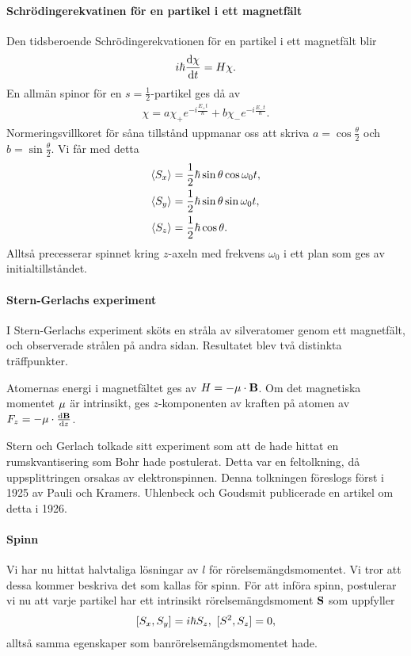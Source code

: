 \paragraph{Schrödingerekvatinen för en partikel i ett magnetfält}
Den tidsberoende Schrödingerekvationen för en partikel i ett magnetfält blir
\begin{align*}
	i\hbar\dv{\chi}{t} = H\chi.
\end{align*}
En allmän spinor för en $s = \frac{1}{2}$-partikel ges då av
\begin{align*}
	\chi = a\chi_{+}e^{-i\frac{E_{+}t}{\hbar}} + b\chi_{-}e^{-i\frac{E_{-}t}{\hbar}}.
\end{align*}
Normeringsvillkoret för såna tillstånd uppmanar oss att skriva $a = \cos{\frac{\theta}{2}}$ och $b = \sin{\frac{\theta}{2}}$. Vi får med detta
\begin{align*}
	\expval{S_{x}} &= \frac{1}{2}\hbar\sin{\theta}\cos{\omega_{0}t}, \\
	\expval{S_{y}} &= \frac{1}{2}\hbar\sin{\theta}\sin{\omega_{0}t}, \\
	\expval{S_{z}} &= \frac{1}{2}\hbar\cos{\theta}.
\end{align*}
Alltså precesserar spinnet kring $z$-axeln med frekvens $\omega_{0}$ i ett plan som ges av initialtillståndet.

\paragraph{Stern-Gerlachs experiment}
I Stern-Gerlachs experiment sköts en stråla av silveratomer genom ett magnetfält, och observerade strålen på andra sidan. Resultatet blev två distinkta träffpunkter.

Atomernas energi i magnetfältet ges av $H = -\vb{\mu}\cdot\vb{B}$. Om det magnetiska momentet $\vb{\mu}$ är intrinsikt, ges $z$-komponenten av kraften på atomen av $F_{z} = -\vb{\mu}\cdot\dv{\vb{B}}{z}$.

Stern och Gerlach tolkade sitt experiment som att de hade hittat en rumskvantisering som Bohr hade postulerat. Detta var en feltolkning, då uppsplittringen orsakas av elektronspinnen. Denna tolkningen föreslogs först i 1925 av Pauli och Kramers. Uhlenbeck och Goudsmit publicerade en artikel om detta i 1926.

\paragraph{Spinn}
Vi har nu hittat halvtaliga lösningar av $l$ för rörelsemängdsmomentet. Vi tror att dessa kommer beskriva det som kallas för spinn. För att införa spinn, postulerar vi nu att varje partikel har ett intrinsikt rörelsemängdsmoment $\vb{S}$ som uppfyller
\begin{align*}
	[S_{x}, S_{y}] = i\hbar S_{z},\ [S^{2}, S_{z}] = 0,
\end{align*}
alltså samma egenskaper som banrörelsemängdsmomentet hade.

